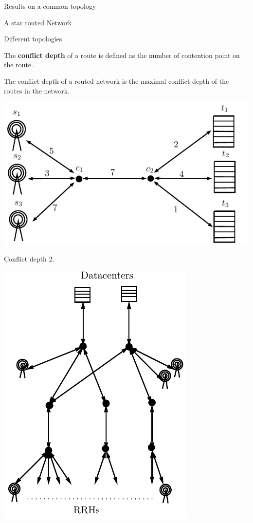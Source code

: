 \documentclass[10 pt]{beamer}
\begin{document}
\begin{section}{Results on a common topology}

\begin{subsection}{A star routed Network}
\begin{frame}{Different topologies}

The  {\bf conflict depth} of a route is defined as the number of contention point on the route.

The conflict depth of a routed network is the maximal conflict depth of the routes in the network.
  \centering
   \begin{multicols}{2}


\includegraphics[scale=0.5]{starfronthaul}

 \vspace{1cm}
\centering
 Conflict depth $2$.
 

 

 
\includegraphics[scale=0.5]{extendendgraphgrey}\\
 \centering


\end{multicols}
\end{frame}
\end{subsection}
\end{section}
\end{document}
